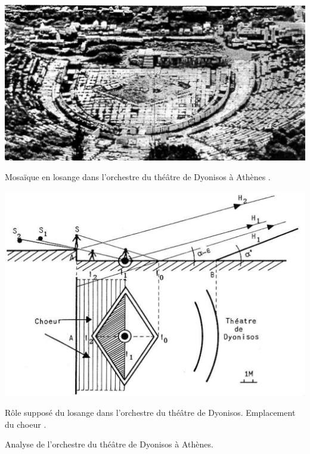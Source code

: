 \begin{figureth}
	\begin{subfigureth}{0.48\textwidth}
		\includegraphics[width=\linewidth]{images/dyonisos1}
		\caption[Mosaïque en losange dans l'orchestre du théâtre de Dyonisos à Athènes.]{Mosaïque en losange dans l'orchestre du théâtre de Dyonisos à Athènes \footnotemark.}
		\label{dyonisos1}
		\hfill
		\quad
	\end{subfigureth}
	\quad
	\begin{subfigureth}{0.48\textwidth}
		\includegraphics[width=\linewidth]{images/dyonisos2}
		\caption[Rôle supposé du losange dans l'orchestre du théâtre de Dyonisos. Emplacement du choeur.]{Rôle supposé du losange dans l'orchestre du théâtre de Dyonisos. Emplacement du choeur \footnotemark.}
		\label{dyonisos2}
		\quad
	\end{subfigureth} 
\caption{Analyse de l'orchestre du théâtre de Dyonisos à Athènes.}	
\label{dyonisos}
\end{figureth}	
\addtocounter{footnote}{-1}
\addtocounter{footnote}{1}

